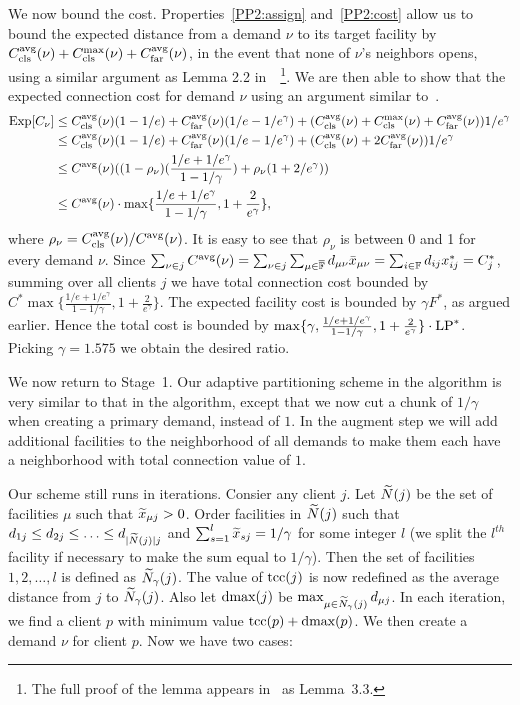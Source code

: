 \documentclass[11pt]{article}
\begin{document}
We now bound the cost. Properties~\ref{PP2:assign}
and~\ref{PP2:cost} allow us to bound the expected distance
from a demand $\nu$ to its target facility by
$C_{\text{cls}}^{{\mbox{\scriptsize\rm avg}}}(\nu)+C_{\text{cls}}^{\max}(\nu)+C_{\text{far}}^{{\mbox{\scriptsize\rm avg}}}(\nu)$, in the event
that none of $\nu$'s neighbors opens, using a similar
argument as Lemma 2.2 in~\cite{ByrkaGS10}~\footnote{The full
  proof of the lemma appears in~\cite{ByrkaA10} as
  Lemma~3.3.}. We are then able to show that the expected
connection cost for demand $\nu$ using an argument similar to~\cite{ByrkaGS10}.
%
\begin{align*}
  \mbox{\rm Exp}[C_{\nu}] &\leq C_{\text{cls}}^{{\mbox{\scriptsize\rm avg}}}(\nu)(1-1/e) +
  C_{\text{far}}^{{\mbox{\scriptsize\rm avg}}}(\nu)(1/e-1/e^\gamma) + (C_{\text{cls}}^{{\mbox{\scriptsize\rm avg}}}(\nu)+C_{\text{cls}}^{\max}(\nu)+C_{\text{far}}^{{\mbox{\scriptsize\rm avg}}}(\nu))1/e^\gamma \\
  &\leq C_{\text{cls}}^{{\mbox{\scriptsize\rm avg}}}(\nu)(1-1/e) +
  C_{\text{far}}^{{\mbox{\scriptsize\rm avg}}}(\nu)(1/e-1/e^\gamma) + (C_{\text{cls}}^{{\mbox{\scriptsize\rm avg}}}(\nu)+2C_{\text{far}}^{{\mbox{\scriptsize\rm avg}}}(\nu))1/e^\gamma\\
  &\leq
  C^{{\mbox{\scriptsize\rm avg}}}(\nu)((1-\rho_{\nu})(\frac{1/e+1/e^\gamma}{1-1/\gamma})
  + \rho_{\nu}(1+2/e^\gamma)) \\
  &\leq C^{{\mbox{\scriptsize\rm avg}}}(\nu) \cdot
  \max\{\frac{1/e+1/e^\gamma}{1-1/\gamma},
  1+\frac{2}{e^\gamma}\},
\end{align*}
%
where $\rho_{\nu}=C_{\text{cls}}^{{\mbox{\scriptsize\rm avg}}}(\nu)/C^{{\mbox{\scriptsize\rm avg}}}(\nu)$. It is easy
to see that $\rho_{\nu}$ is between 0 and 1 for every demand
$\nu$.  Since $\sum_{\nu\in j} C^{{\mbox{\scriptsize\rm avg}}}(\nu) = \sum_{\nu\in
  j}\sum_{\mu\in\overline{\mathbb{F}}} d_{\mu\nu}{\bar x}_{\mu\nu} =
\sum_{i\in\mathbb{F}} d_{ij}x_{ij}^\ast = C_j^\ast$, summing
over all clients $j$ we have total connection cost bounded
by $C^\ast \max\{\frac{1/e+1/e^\gamma}{1-1/\gamma},
1+\frac{2}{e^\gamma}\}$. The expected facility cost is
bounded by $\gamma F^\ast$, as argued earlier. Hence the
total cost is bounded by $\max\{\gamma,
\frac{1/e+1/e^\gamma}{1-1/\gamma},
1+\frac{2}{e^\gamma}\}\cdot \mbox{\rm LP}^\ast$. Picking
$\gamma=1.575$ we obtain the desired ratio.


  We now return to
Stage~1. Our adaptive partitioning scheme in the {\EBGS}
algorithm is very similar to that in the {\EGUP} algorithm,
except that we now cut a chunk of $1/\gamma$ when creating a
primary demand, instead of $1$. In the augment step we will
add additional facilities to the neighborhood of all demands
to make them each have a neighborhood with total connection
value of $1$.

Our scheme still runs in iterations. Consier any client $j$.
Let ${\widetilde N}(j)$ be the set of facilities $\mu$ such that
${\widetilde x}_{\mu j}>0$. Order facilities in ${\widetilde N}(j)$ such
that $d_{1 j} \leq d_{2 j} \leq \ldots \leq d_{|{\widetilde N}(j)|
  j}$ and $\sum_{s=1}^l {\widetilde x}_{s j} = 1/\gamma$ for some
integer $l$ (we split the $l^{th}$ facility if necessary to
make the sum equal to $1/\gamma$). Then the set of
facilities $1,2,\ldots,l$ is defined as
${\widetilde N}_{\gamma}(j)$.  The value of $\textrm{tcc}(j)$ is now
redefined as the average distance from $j$ to
${\widetilde N}_{\gamma}(j)$. Also let $\text{dmax}(j)$ be $\max_{\mu\in
  {\widetilde N}_{\gamma}(j)}d_{\mu j}$. In each iteration, we
find a client $p$ with minimum value $\textrm{tcc}(p)+\text{dmax}(p)$. We
then create a demand $\nu$ for client $p$. Now we have two
cases:
\end{document}
